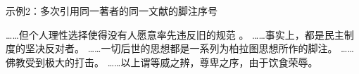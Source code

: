 \documentclass{article}
\begin{document}
\begin{refsection}
示例2：多次引用同一著者的同一文献的脚注序号

……但个人理性选择使得没有人愿意率先违反旧的规范
。
……事实上，都是民主制度的坚决反对者。
……一切后世的思想都是一系列为柏拉图思想所作的脚注。
……佛教受到极大的打击。
……以上谓等威之辨，尊卑之序，由于饮食荣辱。
\end{refsection}
\end{document}
